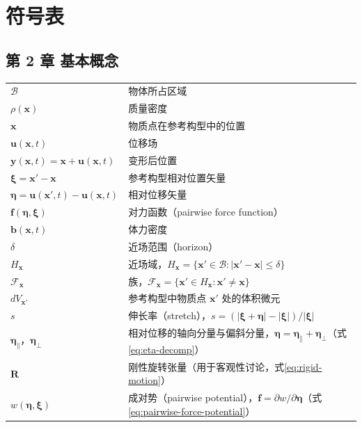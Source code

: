 \chapter{符号表}

\section*{第 2 章 基本概念}

{\small
\begin{tabular}{@{}p{}@{}p{}@{}}
  $\mathcal{B}$ & 物体所占区域 \\
  $\rho(\mathbf{x})$ & 质量密度 \\
  $\mathbf{x}$ & 物质点在参考构型中的位置 \\
  $\mathbf{u}(\mathbf{x},t)$ & 位移场 \\
  $\mathbf{y}(\mathbf{x},t)=\mathbf{x}+\mathbf{u}(\mathbf{x},t)$ & 变形后位置 \\
  $\boldsymbol{\xi}=\mathbf{x}'-\mathbf{x}$ & 参考构型相对位置矢量 \\
  $\boldsymbol{\eta}=\mathbf{u}(\mathbf{x}',t)-\mathbf{u}(\mathbf{x},t)$ & 相对位移矢量 \\
  $\mathbf{f}(\boldsymbol{\eta},\boldsymbol{\xi})$ & 对力函数（pairwise force function） \\
  $\mathbf{b}(\mathbf{x},t)$ & 体力密度 \\
  $\delta$ & 近场范围（horizon） \\
  $H_{\mathbf{x}}$ & 近场域，$H_{\mathbf{x}}=\{\mathbf{x}'\in\mathcal{B}:|\mathbf{x}'-\mathbf{x}|\le\delta\}$ \\
  $\mathcal{F}_{\mathbf{x}}$ & 族，$\mathcal{F}_{\mathbf{x}}=\{\mathbf{x}'\in H_{\mathbf{x}}:\mathbf{x}'\neq\mathbf{x}\}$ \\
  $dV_{\mathbf{x}'}$ & 参考构型中物质点 $\mathbf{x}'$ 处的体积微元 \\
  $s$ & 伸长率（stretch），$s=(|\boldsymbol{\xi}+\boldsymbol{\eta}|-|\boldsymbol{\xi}|)/|\boldsymbol{\xi}|$ \\
  $\boldsymbol{\eta}_{\parallel}$，$\boldsymbol{\eta}_{\perp}$ & 相对位移的轴向分量与偏斜分量，$\boldsymbol{\eta}=\boldsymbol{\eta}_{\parallel}+\boldsymbol{\eta}_{\perp}$（式\eqref{eq:eta-decomp}） \\
  $\mathbf{R}$ & 刚性旋转张量（用于客观性讨论，式\eqref{eq:rigid-motion}） \\
  $w(\boldsymbol{\eta},\boldsymbol{\xi})$ & 成对势（pairwise potential），$\mathbf{f}=\partial w/\partial\boldsymbol{\eta}$（式\eqref{eq:pairwise-force-potential}） \\

\end{tabular}}
